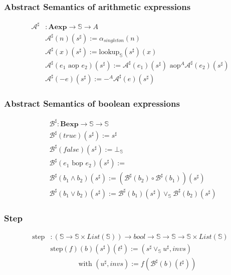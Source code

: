 \documentclass{beamer}
\begin{document}
\begin{frame}
    \frametitle{Abstract Semantics of arithmetic expressions}
    \begin{align*} 
     \mathcal{A}^{\sharp} &: \mathbf{A e x p} \rightarrow \mathbb{S} \rightarrow A \\
    & \mathcal{A}^{\sharp}(n)(s^{\sharp}) := \alpha_{singleton}(n)\\
    & \mathcal{A}^{\sharp} (x) (s^{\sharp}) := \text{lookup}_\mathbb{S}(s^{\sharp})(x) \\
    & \mathcal{A}^{\sharp} ( e_1 \text{ aop } e_2 ) (s^{\sharp}) := \mathcal{A}^{\sharp} (e_1) (s^{\sharp}) \text{ aop}^A \mathcal{A}^{\sharp} (e_2) (s^{\sharp})\\
    & \mathcal{A}^{\sharp} ( -e ) (s^{\sharp}) := -^A \mathcal{A}^{\sharp} (e) (s^{\sharp})
\end{align*}
\end{frame}

\begin{frame}
    \frametitle{Abstract Semantics of boolean expressions}
    \begin{align*} 
    & \mathcal{B}^{\sharp}: \mathbf{B e x p} \rightarrow \mathbb{S} \rightarrow \mathbb{S} \\
    & \mathcal{B}^{\sharp} (true) (s^{\sharp}) := s^{\sharp} \\
    & \mathcal{B}^{\sharp} (false) (s^{\sharp}) := \bot_\mathbb{S} \\
    & \mathcal{B}^{\sharp} ( e_1 \text{ bop } e_2 ) (s^{\sharp}) := \\
    & \mathcal{B}^{\sharp} ( b_1 \land b_2 ) (s^{\sharp}) := (\mathcal{B}^{\sharp} ( b_2 ) \circ \mathcal{B}^{\sharp} ( b_1 )) (s^{\sharp}) \\
    & \mathcal{B}^{\sharp} ( b_1 \lor b_2 ) (s^{\sharp}) := \mathcal{B}^{\sharp} ( b_1) (s^{\sharp}) \vee_\mathbb{S} \mathcal{B}^{\sharp} ( b_2) (s^{\sharp})
\end{align*}
\end{frame}


\begin{frame}
    \frametitle{Step}
    \begin{align*}
        \text{step} &: (\mathbb{S} \to \mathbb{S} \times List(\mathbb{S})) \to bool \to \mathbb{S} \to \mathbb{S} \to \mathbb{S} \times List(\mathbb{S}) \\
        &\text{step} (f) (b) (s^{\sharp}) (t^{\sharp}) := (s^{\sharp} \vee_\mathbb{S} u^{\sharp}, invs)\\
        & \qquad \qquad \text{with } (u^{\sharp}, invs) := f (\mathcal{B}^{\sharp} (b) (t^{\sharp}))
    \end{align*}
\end{frame}
\end{document}
